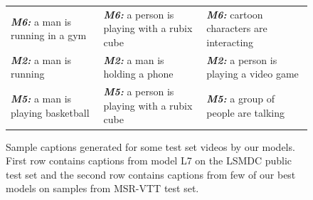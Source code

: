 \begin{figure}[thp]
\begin{center}
\begin{adjustbox}{center}
\begin{tabular}{lll}
    \textbf{\scriptsize\em M6:} \scriptsize a man is running in a gym &
    \textbf{\scriptsize\em M6:} \scriptsize a person is playing with a rubix cube &
    \textbf{\scriptsize\em M6:} \scriptsize cartoon characters are interacting\\
    \textbf{\scriptsize\em M2:} \scriptsize a man is running&
    \textbf{\scriptsize\em M2:} \scriptsize a man is holding a phone&
    \textbf{\scriptsize\em M2:} \scriptsize a person is playing a video game\\
    \textbf{\scriptsize\em M5:} \scriptsize a man is playing basketball&
    \textbf{\scriptsize\em M5:} \scriptsize a person is playing with a rubix cube &
    \textbf{\scriptsize\em M5:} \scriptsize a group of people are talking\\
  \end{tabular}
  \end{adjustbox}
  \end{center}
  \vspace{-5mm}
  \caption{Sample captions generated for some test set videos by our models.
  First row contains captions from model L7 on the LSMDC public test set and the
  second row contains captions from few of our best models on samples from
  MSR-VTT test set. }
  \label{fig:VttcapSamps}
\end{figure}

